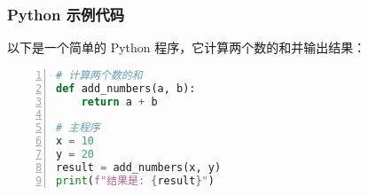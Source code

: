 \documentclass{beamer}
\begin{document}
\begin{frame}[fragile]
\frametitle{Python 示例代码}
以下是一个简单的 Python 程序，它计算两个数的和并输出结果：
\begin{lstlisting}[language=Python, caption=计算两个数的和, label={lst:sum}, frame=single, numbers=left, backgroundcolor=\color{lightgray}]
# 计算两个数的和
def add_numbers(a, b):
    return a + b

# 主程序
x = 10
y = 20
result = add_numbers(x, y)
print(f"结果是: {result}")
\end{lstlisting}

\end{frame}
\end{document}
